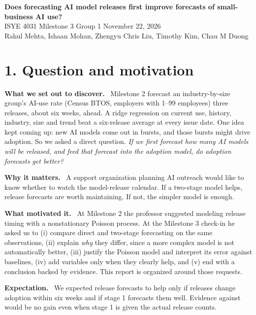 \documentclass[10pt]{article}
\newcommand{\sub}[1]{\textbf{#1}\ }
\begin{document}
{\Large\bfseries Does forecasting AI model releases first improve forecasts of small-business AI use?}\\[2pt]
ISYE 4031 Milestone 3 \textbullet{} Group 1 \textbullet{} November 22, 2026\\
Rahul Mehta, Ishaan Mohan, Zhengyu Chris Liu, Timothy Kim, Chau M Duong

\section{1. Question and motivation}
\sub{What we set out to discover.} Milestone 2 forecast an industry-by-size group's AI-use rate (Census BTOS, employers with 1--99 employees) three releases, about six weeks, ahead. A ridge regression on current use, history, industry, size and trend beat a six-release average at every issue date. One idea kept coming up: new AI models come out in bursts, and those bursts might drive adoption. So we asked a direct question. \emph{If we first forecast how many AI models will be released, and feed that forecast into the adoption model, do adoption forecasts get better?}

\sub{Why it matters.} A support organization planning AI outreach would like to know whether to watch the model-release calendar. If a two-stage model helps, release forecasts are worth maintaining. If not, the simpler model is enough.

\sub{What motivated it.} At Milestone 2 the professor suggested modeling release timing with a nonstationary Poisson process. At the Milestone 3 check-in he asked us to (i) compare direct and two-stage forecasting on the same observations, (ii) explain \emph{why} they differ, since a more complex model is not automatically better, (iii) justify the Poisson model and interpret its error against baselines, (iv) add variables only when they clearly help, and (v) end with a conclusion backed by evidence. This report is organized around those requests.

\sub{Expectation.} We expected release forecasts to help only if releases change adoption within six weeks and if stage 1 forecasts them well. Evidence against would be no gain even when stage 1 is given the actual release counts.
\end{document}
